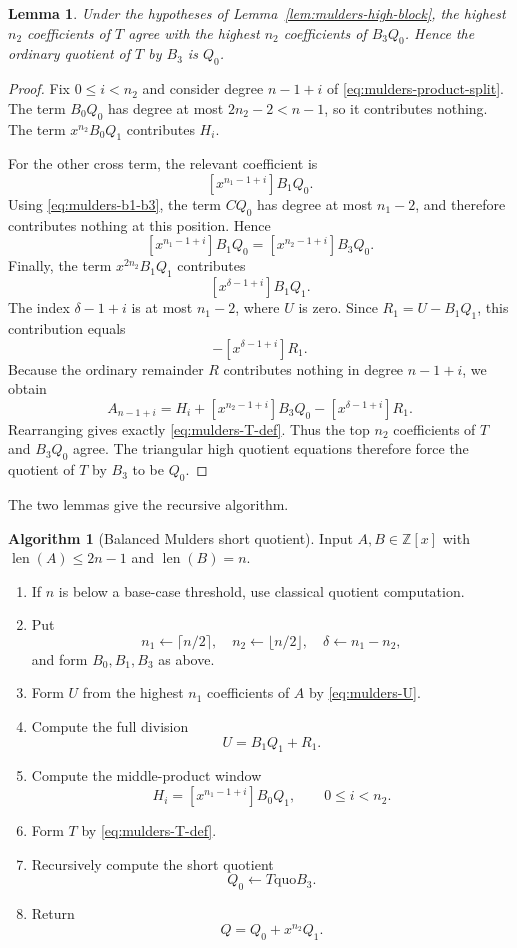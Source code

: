 \documentclass[11pt]{book}
\newtheorem{lemma}[theorem]{Lemma}
\theoremstyle{definition}
\newtheorem{algorithm}[theorem]{Algorithm}
\newcommand{\ZZ}{\mathbb Z}
\newcommand{\len}{\operatorname{len}}
\begin{document}
\begin{lemma}\label{lem:mulders-low-block}
Under the hypotheses of Lemma~\ref{lem:mulders-high-block}, the highest
$n_2$ coefficients of $T$ agree with the highest $n_2$ coefficients of
$B_3Q_0$.  Hence the ordinary quotient of $T$ by $B_3$ is $Q_0$.
\end{lemma}

\begin{proof}
Fix $0\leq i<n_2$ and consider degree $n-1+i$ of
\eqref{eq:mulders-product-split}.  The term $B_0Q_0$ has degree at most
$2n_2-2<n-1$, so it contributes nothing.  The term $x^{n_2}B_0Q_1$
contributes $H_i$.

For the other cross term, the relevant coefficient is
\[
 [x^{n_1-1+i}]B_1Q_0.
\]
Using \eqref{eq:mulders-b1-b3}, the term $CQ_0$ has degree at most
$n_1-2$, and therefore contributes nothing at this position.  Hence
\[
 [x^{n_1-1+i}]B_1Q_0
 =[x^{n_2-1+i}]B_3Q_0.
\]
Finally, the term $x^{2n_2}B_1Q_1$ contributes
\[
 [x^{\delta-1+i}]B_1Q_1.
\]
The index $\delta-1+i$ is at most $n_1-2$, where $U$ is zero.  Since
$R_1=U-B_1Q_1$, this contribution equals
\[
 -[x^{\delta-1+i}]R_1.
\]
Because the ordinary remainder $R$ contributes nothing in degree $n-1+i$, we
obtain
\[
 A_{n-1+i}
 =H_i+[x^{n_2-1+i}]B_3Q_0-[x^{\delta-1+i}]R_1.
\]
Rearranging gives exactly \eqref{eq:mulders-T-def}.  Thus the top $n_2$
coefficients of $T$ and $B_3Q_0$ agree.  The triangular high quotient
equations therefore force the quotient of $T$ by $B_3$ to be $Q_0$.
\end{proof}

The two lemmas give the recursive algorithm.

\begin{algorithm}[Balanced Mulders short quotient]\label{alg:mulders-balanced}
Input $A,B\in\ZZ[x]$ with $\len(A)\leq2n-1$ and $\len(B)=n$.
\begin{enumerate}
 \item If $n$ is below a base-case threshold, use classical quotient
 computation.
 \item Put
 \[
 n_1\leftarrow\lceil n/2\rceil,
 \quad n_2\leftarrow\lfloor n/2\rfloor,
 \quad \delta\leftarrow n_1-n_2,
 \]
 and form $B_0,B_1,B_3$ as above.
 \item Form $U$ from the highest $n_1$ coefficients of $A$ by
 \eqref{eq:mulders-U}.
 \item Compute the full division
 \[
 U=B_1Q_1+R_1.
 \]
 \item Compute the middle-product window
 \[
 H_i=[x^{n_1-1+i}]B_0Q_1,
 \qquad 0\leq i<n_2.
 \]
 \item Form $T$ by \eqref{eq:mulders-T-def}.
 \item Recursively compute the short quotient
 \[
 Q_0\leftarrow T\mathbin{\mathrm{quo}}B_3.
 \]
 \item Return
 \[
 Q=Q_0+x^{n_2}Q_1.
 \]
\end{enumerate}
\end{algorithm}
\end{document}
